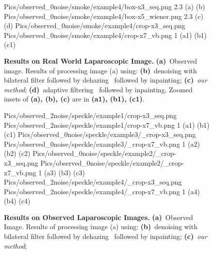 \begin{figure}[!t]
     {Pics/observed_0noise/smoke/example4/box-x3_seq.png} {2.3} {(a)} {(b)}
     {Pics/observed_0noise/smoke/example4/box-x5_wiener.png} {2.3} {(c)} {(d)}
     {Pics/observed_0noise/smoke/example4/crop-x3_seq.png} {Pics/observed_0noise/smoke/example4/crop-x7_vb.png} {1} {(a1)} {(b1)} {(c1)}
    \caption
    {
        {\bf Results on Real World Laparoscopic Image.}
        {\bf (a)}~Observed image.
        Results of processing image (a) using:
        {\bf (b)}~denoising with bilateral filter followed by dehazing~\cite{he2011dark} followed by inpainting;
        {\bf (c)}~{\em our method};
        {\bf (d)}~adaptive filtering~\cite{gibson2013wiener} followed by inpainting.
        Zoomed insets of {\bf (a), (b), (c)} are in {\bf (a1), (b1), (c1)}.
    }
    \label{fig:resultsObs3}
\end{figure}

\begin{figure}[!t]
     {Pics/observed_2noise/speckle/example1/crop-x3_seq.png} {Pics/observed_2noise/speckle/example1/crop-x7_vb.png} {1} {(a1)} {(b1)} {(c1)}
     {Pics/observed_0noise/speckle/example3/_crop-x3_seq.png} {Pics/observed_0noise/speckle/example3/_crop-x7_vb.png} {1} {(a2)} {(b2)} {(c2)}
     {Pics/observed_0noise/speckle/example2/_crop-x3_seq.png} {Pics/observed_0noise/speckle/example2/_crop-x7_vb.png} {1} {(a3)} {(b3)} {(c3)}
     {Pics/observed_2noise/speckle/example4/_crop-x3_seq.png} {Pics/observed_2noise/speckle/example4/_crop-x7_vb.png} {1} {(a4)} {(b4)} {(c4)}
    \caption
    {
        {\bf Results on Observed Laparoscopic Images.}
        {\bf (a)}~Observed Image.
        Results of processing image (a) using:
        {\bf (b)}~denoising with bilateral filter followed by dehazing~\cite{he2011dark} followed by inpainting;
        {\bf (c)}~{\em our method};
    }
    \label{fig:resultsObs4}
\end{figure}


